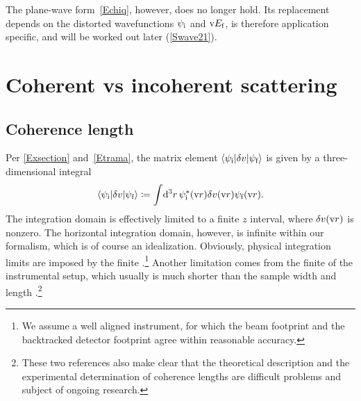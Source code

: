 %
%
%
%
The plane-wave form~\cref{Echiq}, however, does no longer hold.
Its replacement depends on the distorted wavefunctions
$\psi_{\text{i}}$ and $\text{v}{E}_{\text{f}}$,
is therefore application specific,
and will be worked out later (\cref{Swave21}).
\fi

%

\section{Coherent vs incoherent scattering}\label{Scoherlen}

\subsection{Coherence length}

Per \cref{Exsection} and~\cref{Etrama},
%
the matrix element $\left\langle \psi_{\text{i}}|\delta v|\psi_{\text{f}}\right\rangle$
is given by a three-dimensional integral
\begin{equation}\label{Etrama3}
  \left\langle \psi_{\text{i}}|\delta v|\psi_{\text{f}}\right\rangle
  \coloneqq  \int\!\mathrm d^3r\, \psi^{*}_{\text{i}}(\text{v}{r})\delta v(\text{v}{r})\psi_{\text{f}}(\text{v}{r}).
\end{equation}
The integration domain is effectively limited to a finite $z$ interval,
where $\delta v(\text{v}{r})$ is nonzero.
The horizontal integration domain, however, is infinite
within our formalism,
which is of course an idealization.
Obviously, physical integration limits are imposed by the finite
%
.\footnote
{We assume a well aligned instrument,
for which the beam footprint and the backtracked detector footprint
%
%
%
agree within reasonable accuracy.}
Another limitation comes from the finite 
of the instrumental setup,
which usually is much shorter than the sample width and length
\cite{HaPR10,MaMM14}.\footnote
{These two references also make clear that
  the theoretical description and the experimental determination of
  coherence lengths are difficult problems and subject of ongoing research.}


